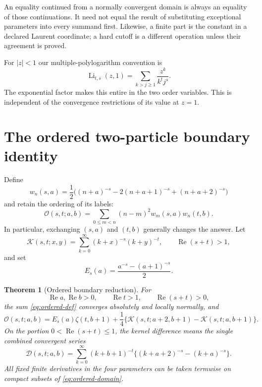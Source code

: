 \documentclass[11pt,a4paper]{article}
\numberwithin{equation}{section}
\newtheorem{theorem}{Theorem}[section]
\theoremstyle{definition}
\theoremstyle{remark}
\DeclareMathOperator{\Li}{Li}
\newcommand{\Rea}{\operatorname{Re}}
\newcommand{\Ord}{\mathcal O}
\newcommand{\Kern}{\mathcal K}
\newcommand{\Def}{\mathcal D}
\begin{document}
An equality continued from a normally convergent domain is always an
equality of those continuations. It need not equal the result of
substituting exceptional parameters into every summand first.
Likewise, a finite part is the constant in a declared Laurent
coordinate; a hard cutoff is a different operation unless their
agreement is proved.

For $|z|<1$ our multiple-polylogarithm convention is
\begin{equation}\label{eq:mpl-convention}
 \Li_{t,s}(z,1)=\sum_{k>j\ge1}\frac{z^k}{k^t j^s}.
\end{equation}
The exponential factor makes this entire in the two order variables.
This is independent of the convergence restrictions of its value at
$z=1$.

\tableofcontents
\clearpage
\section{The ordered two-particle boundary identity}
\label{sec:ordered}

Define
\begin{equation}\label{eq:weight-two}
 w_n(s,a)=\frac12\bigl((n+a)^{-s}-2(n+a+1)^{-s}
                           +(n+a+2)^{-s}\bigr)
\end{equation}
and retain the ordering of its labels:
\begin{equation}\label{eq:ordered-def}
 \Ord(s,t;a,b)=\sum_{0\le m<n}(n-m)^2w_m(s,a)w_n(t,b).
\end{equation}
In particular, exchanging $(s,a)$ and $(t,b)$ generally changes the
answer. Let
\begin{equation}\label{eq:kernel-def}
 \Kern(s,t;x,y)=\sum_{k=0}^{\infty}(k+x)^{-s}(k+y)^{-t},
 \qquad \Rea(s+t)>1,
\end{equation}
and set
\begin{equation}\label{eq:boundary-coefficient}
 E_s(a)=\frac{a^{-s}-(a+1)^{-s}}2.
\end{equation}

\begin{theorem}[Ordered boundary reduction]\label{thm:ordered}
For
\begin{equation}\label{eq:ordered-domain}
 \Rea a,\Rea b>0,\qquad \Rea t>1,\qquad \Rea(s+t)>0,
\end{equation}
the sum \eqref{eq:ordered-def} converges absolutely and locally
normally, and
\begin{equation}\label{eq:ordered-main}
 \boxed{\Ord(s,t;a,b)=E_s(a)\zeta(t,b+1)
 +\frac14\bigl\{\Kern(s,t;a+2,b+1)-\Kern(s,t;a,b+1)\bigr\}.}
\end{equation}
On the portion $0<\Rea(s+t)\le1$, the kernel difference means the
single combined convergent series
\begin{equation}\label{eq:kernel-difference}
 \Def(s,t;a,b)=\sum_{k=0}^{\infty}(k+b+1)^{-t}
                  \bigl\{(k+a+2)^{-s}-(k+a)^{-s}\bigr\}.
\end{equation}
All fixed finite derivatives in the four parameters can be taken
termwise on compact subsets of \eqref{eq:ordered-domain}.
\end{theorem}
\end{document}
